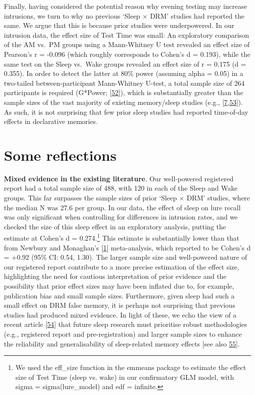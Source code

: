 \documentclass[
]{article}
\begin{document}
Finally, having considered the potential reason why evening testing may increase intrusions, we turn to why no previous `Sleep \(\times\) DRM' studies had reported the same. We argue that this is because prior studies were underpowered. In our intrusion data, the effect size of Test Time was small: An exploratory comparison of the AM vs.~PM groups using a Mann-Whitney U test revealed an effect size of Pearson's r = -0.096 (which roughly corresponds to Cohen's d = 0.193), while the same test on the Sleep vs.~Wake groups revealed an effect size of r = 0.175 (d = 0.355). In order to detect the latter at 80\% power (assuming alpha = 0.05) in a two-tailed between-participant Mann-Whitney U-test, a total sample size of 264 participants is required (G*Power; {[}\protect\hyperlink{ref-faul2009a}{52}{]}), which is substantially greater than the sample sizes of the vast majority of existing memory/sleep studies (e.g., {[}\protect\hyperlink{ref-payne2009a}{7},\protect\hyperlink{ref-yaremenko2021a}{53}{]}). As such, it is not surprising that few prior sleep studies had reported time-of-day effects in declarative memories.

\hypertarget{some-reflections}{%
\section{Some reflections}\label{some-reflections}}

\textbf{Mixed evidence in the existing literature}. Our well-powered registered report had a total sample size of 488, with 120 in each of the Sleep and Wake groups. This far surpasses the sample sizes of prior `Sleep \(\times\) DRM' studies, where the median N was 27.6 per group. In our data, the effect of sleep on lure recall was only significant when controlling for differences in intrusion rates, and we checked the size of this sleep effect in an exploratory analysis, putting the estimate at Cohen's d = 0.274.\footnote{We used the eff\_size function in the emmeans package to estimate the effect size of Test Time (sleep vs. wake) in our confirmatory GLM model, with sigma = sigma(lure\_model) and edf = infinite.} This estimate is substantially lower than that from Newbury and Monaghan's {[}\protect\hyperlink{ref-newbury2019a}{1}{]} meta-analysis, which reported to be Cohen's d = +0.92 (95\% CI: 0.54, 1.30). The larger sample size and well-powered nature of our registered report contribute to a more precise estimation of the effect size, highlighting the need for cautious interpretation of prior evidence and the possibility that prior effect sizes may have been inflated due to, for example, publication bias and small sample sizes. Furthermore, given sleep had such a small effect on DRM false memory, it is perhaps not surprising that previous studies had produced mixed evidence. In light of these, we echo the view of a recent article {[}\protect\hyperlink{ref-cordi2021a}{54}{]} that future sleep research must prioritise robust methodologies (e.g., registered report and pre-registration) and larger sample sizes to enhance the reliability and generalisability of sleep-related memory effects {[}see also \protect\hyperlink{ref-nemeth2019a}{55}{]}.
\end{document}
